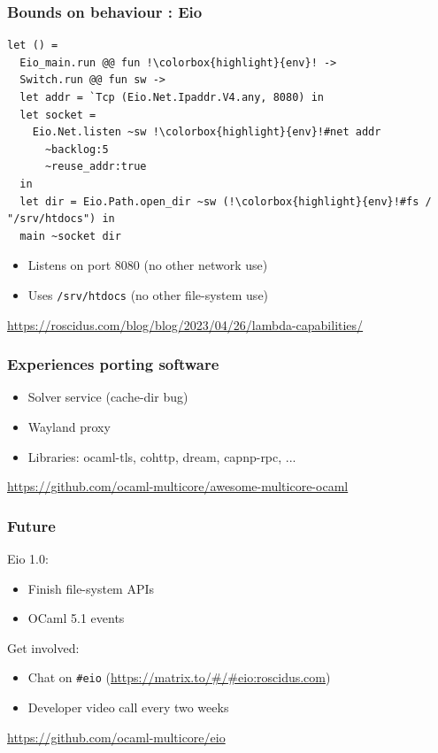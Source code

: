 \documentclass{beamer}
\begin{document}
\begin{frame}[fragile]
	\frametitle{Bounds on behaviour : Eio}

	\setlength\fboxsep{1.2pt}
	\begin{lstlisting}[style=ocaml,escapechar=!]
let () =
  Eio_main.run @@ fun !\colorbox{highlight}{env}! ->
  Switch.run @@ fun sw ->
  let addr = `Tcp (Eio.Net.Ipaddr.V4.any, 8080) in
  let socket =
    Eio.Net.listen ~sw !\colorbox{highlight}{env}!#net addr
      ~backlog:5
      ~reuse_addr:true
  in
  let dir = Eio.Path.open_dir ~sw (!\colorbox{highlight}{env}!#fs / "/srv/htdocs") in
  main ~socket dir
	\end{lstlisting}
	\begin{itemize}
                \item Listens on port 8080 (no other network use)
                \item Uses \verb|/srv/htdocs| (no other file-system use)
	\end{itemize}
	\bigskip
	\url{https://roscidus.com/blog/blog/2023/04/26/lambda-capabilities/}
\end{frame}

\begin{frame}
	\frametitle{Experiences porting software}
	\begin{itemize}
		\item Solver service (cache-dir bug)
		\item Wayland proxy
		\item Libraries: ocaml-tls, cohttp, dream, capnp-rpc, ...
	\end{itemize}
	\bigskip
	\url{https://github.com/ocaml-multicore/awesome-multicore-ocaml}
\end{frame}

\begin{frame}[fragile]
	\frametitle{Future}
	Eio 1.0:
	\begin{itemize}
		\item Finish file-system APIs
		\item OCaml 5.1 events
	\end{itemize}
	\bigskip
	Get involved:
	\begin{itemize}
		\item Chat on \verb|#eio| (\url{https://matrix.to/#/#eio:roscidus.com})
		\item Developer video call every two weeks
	\end{itemize}
	\bigskip
	\url{https://github.com/ocaml-multicore/eio}
\end{frame}
\end{document}
